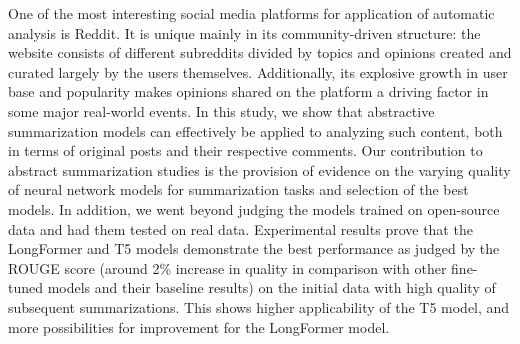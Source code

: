 One of the most interesting social media platforms for application of automatic analysis is Reddit. It is unique mainly in its community-driven structure: the website consists of different subreddits divided by topics and opinions created and curated largely by the users themselves. Additionally, its explosive growth in user base and popularity makes opinions shared on the platform a driving factor in some major real-world events. In this study, we show that abstractive summarization models can effectively be applied to analyzing such content, both in terms of original posts and their respective comments. Our contribution to abstract summarization studies is the provision of evidence on the varying quality of neural network models for summarization tasks and selection of the best models. In addition, we went beyond judging the models trained on open-source data and had them tested on real data. Experimental results prove that the LongFormer and T5 models demonstrate the best performance as judged by the ROUGE score (around 2\% increase in quality in comparison with other fine-tuned models and their baseline results) on the initial data with high quality of subsequent summarizations. This shows higher applicability of the T5 model, and more possibilities for improvement for the LongFormer model.

